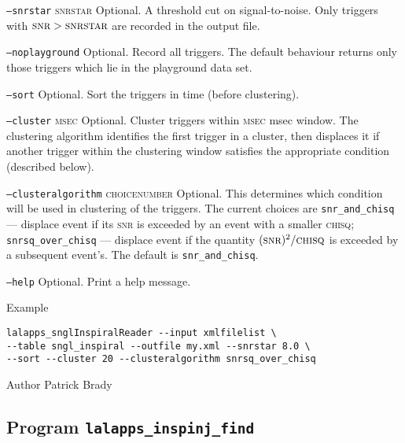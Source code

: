 \begin{entry}
\begin{entry}
\item[\texttt{--snrstar} \textsc{snrstar}] Optional.  A threshold cut
on signal-to-noise.  Only triggers with $\textsc{snr} > \textsc{snrstar}$
are recorded in the output file.

\item[\texttt{--noplayground}] Optional.  Record all triggers.  The
default behaviour returns only those triggers which lie in the
playground data set.  

\item[\texttt{--sort}] Optional.   Sort the triggers in time (before
clustering).  

\item[\texttt{--cluster} \textsc{msec}] Optional.  Cluster triggers
within \textsc{msec} msec window.   The clustering algorithm
identifies the first trigger in a cluster, then displaces it if another 
trigger within the clustering window satisfies the appropriate condition 
(described below).

\item[\texttt{--clusteralgorithm} \textsc{choicenumber}]  Optional.  This
determines which condition will be used in clustering of the triggers.
The current choices are \texttt{snr\_and\_chisq} --- displace event if
its \textsc{snr} is exceeded by an event with a smaller
\textsc{chisq}; \texttt{snrsq\_over\_chisq} --- displace event if the
quantity $(\textsc{snr})^{2}/\textsc{chisq}$ is exceeded by a subsequent
event's.  The default is \texttt{snr\_and\_chisq}.

\item[\texttt{--help}] Optional.  Print a help message.
\end{entry}

\item[Example]
\begin{verbatim}
lalapps_snglInspiralReader --input xmlfilelist \
--table sngl_inspiral --outfile my.xml --snrstar 8.0 \
--sort --cluster 20 --clusteralgorithm snrsq_over_chisq
\end{verbatim}

\item[Author] 
Patrick Brady
\end{entry}
\clearpage



%
% 
\clearpage
\subsection{Program \texttt{lalapps\_inspinj\_find}}
\label{program:lalapps-inspinj-find}
\idx[Program]{lalapps\_inspinj\_find}

